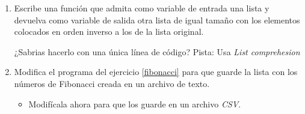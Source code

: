 \begin{enumerate}
\item Escribe una función que admita como variable de entrada una lista y devuelva como variable de salida otra lista de igual tamaño con los elementos colocados en orden inverso a los de la lista original.

¿Sabrias hacerlo con una única línea de código? Pista: Usa \emph{List comprehesion}

\item Modifica el programa del ejercicio \ref{fibonacci} para que guarde la lista con los números de Fibonacci creada en un archivo de texto.
\begin{itemize}
    \item Modifícala ahora para que los guarde en un archivo \emph{CSV}.
\end{itemize}
\end{enumerate}
